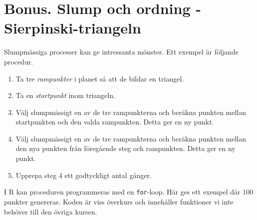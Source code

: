 \documentclass[
]{book}
\providecommand{\tightlist}{%
  \setlength{\itemsep}{0pt}\setlength{\parskip}{0pt}}
\theoremstyle{definition}
\theoremstyle{definition}
\theoremstyle{definition}
\theoremstyle{definition}
\theoremstyle{remark}
\begin{document}
\hypertarget{bonus.-slump-och-ordning---sierpinski-triangeln}{%
\section{Bonus. Slump och ordning - Sierpinski-triangeln}\label{bonus.-slump-och-ordning---sierpinski-triangeln}}

Slumpmässiga processer kan ge intressanta mönster. Ett exempel är följande procedur.

\begin{enumerate}
\def\labelenumi{\arabic{enumi}.}
\tightlist
\item
  Ta tre \emph{rampunkter} i planet så att de bildar en triangel.
\item
  Ta en \emph{startpunkt} inom triangeln.
\item
  Välj slumpmässigt en av de tre rampunkterna och beräkna punkten mellan startpunkten och den valda rampunkten. Detta ger en ny punkt.
\item
  Välj slumpmässigt en av de tre rampunkterna och beräkna punkten mellan den nya punkten från föregående steg och rampunkten. Detta ger en ny punkt.
\item
  Upprepa steg 4 ett godtyckligt antal gånger.
\end{enumerate}

I R kan proceduren programmeras med en \texttt{for}-loop. Här ges ett exempel där 100 punkter genereras. Koden är viss överkurs och innehåller funktioner vi inte behöver till den övriga kursen.
\end{document}
